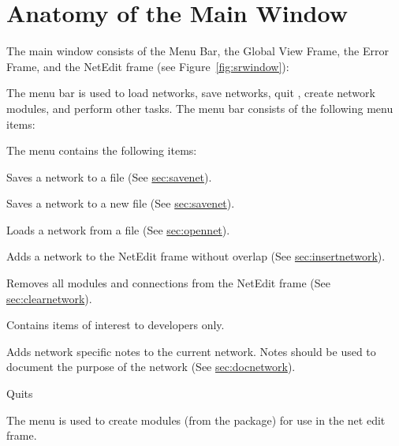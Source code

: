 \section{Anatomy of the Main Window}
\label{sec:windowanatomy}

The \sr{} main window consists of the Menu Bar, the Global View Frame,
the Error Frame, and the NetEdit frame (see
Figure~\ref{fig:srwindow}):

\begin{description}
   The menu bar is used to load networks, save
  networks, quit \sr{}, create network modules, and perform other
  tasks.  The menu bar consists of the following menu items:

  \begin{description}
     The  menu contains the following items:

    \begin{description}
       Saves a network to a file (See \hyperref{this
        section}{Section~}{}{sec:savenet}).

       Saves a network to a new file (See
      \hyperref{this section}{Section~}{}{sec:savenet}).
      
       Loads a network from a file (See
      \hyperref{this section}{Section~}{}{sec:opennet}).
      
       Adds a network to the NetEdit frame
      without overlap (See \hyperref{this
        section}{Section~}{}{sec:insertnetwork}).
      
       Removes all modules and connections from
      the NetEdit frame (See \hyperref{this
        section}{Section~}{}{sec:clearnetwork}).
      
       Contains items of interest to
      developers only.
      
       Adds network specific
      notes to the current network.  Notes should be used to document
      the purpose of the network (See \hyperref{this
        section}{Section~}{}{sec:docnetwork}).
    
       Quits \sr{}
    \end{description}
  \end{description}
  
  \begin{description}
     The  menu is used to create modules
    (from the \sr{} package) for use in the net edit frame.


\end{description}
\end{description}
